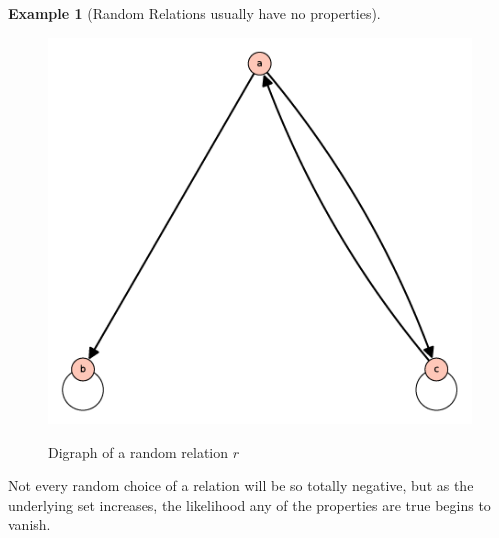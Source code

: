 \documentclass[10pt,]{book}
\theoremstyle{plain}
\theoremstyle{definition}
\theoremstyle{definition}
\theoremstyle{definition}
\newtheorem{example}[theorem]{Example}
\theoremstyle{definition}
\begin{document}
\begin{example}[Random Relations usually have no properties]
\begin{figure}
{\includegraphics[width=1\linewidth]{images/graph-6-3-5.png}}
\caption{Digraph of a random relation \(r\)\label{fig-graph-6-3-5}}
\end{figure}
\par
Not every random choice of a relation will be so totally negative, but as the underlying set increases, the likelihood any of the properties are true begins to vanish.%
\end{example}
\typeout{************************************************}
\typeout{************************************************}
\end{document}
